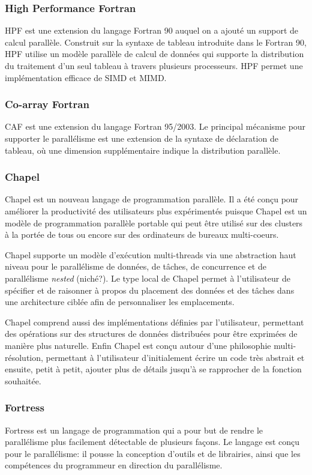 		\subsubsection{High Performance Fortran} 
		HPF est une extension du langage Fortran 90 auquel on a ajouté un support de calcul parallèle. Construit sur la syntaxe de tableau introduite dans le Fortran 90, HPF utilise un modèle parallèle de calcul de données qui supporte la distribution du traitement d'un seul tableau à travers plusieurs processeurs. HPF permet une implémentation efficace de SIMD et MIMD.
	
		\subsubsection{Co-array Fortran} 
		CAF est une extension du langage Fortran 95/2003. Le principal mécanisme pour supporter le parallélisme est une extension de la syntaxe de déclaration de tableau, où une dimension supplémentaire indique la distribution parallèle.

		\subsubsection{Chapel}
		Chapel est un nouveau langage de programmation parallèle. Il a été conçu pour améliorer la productivité des utilisateurs plus expérimentés puisque Chapel est un modèle de programmation parallèle portable qui peut être utilisé sur des clusters à la portée de tous ou encore sur des ordinateurs de bureaux multi-coeurs.
		
		Chapel supporte un modèle d'exécution multi-threads via une abstraction haut niveau pour le parallélisme de données, de tâches, de concurrence et de parallélisme \textit{nested} (niché?). Le type local de Chapel permet à l'utilisateur de spécifier et de raisonner à propos du placement des données et des tâches dans une architecture ciblée afin de personnaliser les emplacements.
		
		Chapel comprend aussi des implémentations définies par l'utilisateur, permettant des opérations sur des structures de données distribuées pour être exprimées de manière plus naturelle. Enfin Chapel est conçu autour d'une philosophie multi-résolution, permettant à l'utilisateur d'initialement écrire un code très abstrait et ensuite, petit à petit, ajouter plus de détails jusqu'à se rapprocher de la fonction souhaitée.
	
		\subsubsection{Fortress} 
		Fortress est un langage de programmation qui a pour but de rendre le parallélisme plus facilement détectable de plusieurs façons. Le langage est conçu pour le parallélisme: il pousse la conception d'outils et de librairies, ainsi que les compétences du programmeur en direction du parallélisme.
		
